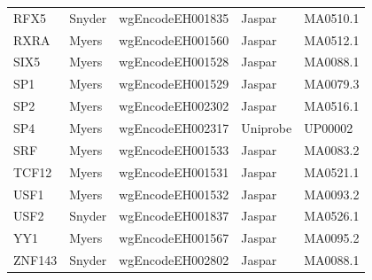 \documentclass{bioinfo}
\begin{document}
\begin{table}[t]
\begin{center}
\begin{tabular}{ l|ll|ll }
        RFX5   & Snyder  & wgEncodeEH001835 & Jaspar     & MA0510.1 \\
        RXRA   & Myers   & wgEncodeEH001560 & Jaspar     & MA0512.1 \\
        SIX5   & Myers   & wgEncodeEH001528 & Jaspar     & MA0088.1 \\
        SP1    & Myers   & wgEncodeEH001529 & Jaspar     & MA0079.3 \\
        SP2    & Myers   & wgEncodeEH002302 & Jaspar     & MA0516.1 \\
        SP4    & Myers   & wgEncodeEH002317 & Uniprobe   & UP00002  \\
        SRF    & Myers   & wgEncodeEH001533 & Jaspar     & MA0083.2 \\
        TCF12  & Myers   & wgEncodeEH001531 & Jaspar     & MA0521.1 \\
        USF1   & Myers   & wgEncodeEH001532 & Jaspar     & MA0093.2 \\
        USF2   & Snyder  & wgEncodeEH001837 & Jaspar     & MA0526.1 \\
        YY1    & Myers   & wgEncodeEH001567 & Jaspar     & MA0095.2 \\
        ZNF143 & Snyder  & wgEncodeEH002802 & Jaspar     & MA0088.1 \\
        \hline
    \end{tabular}
\end{center}
\end{table}
\end{document}
